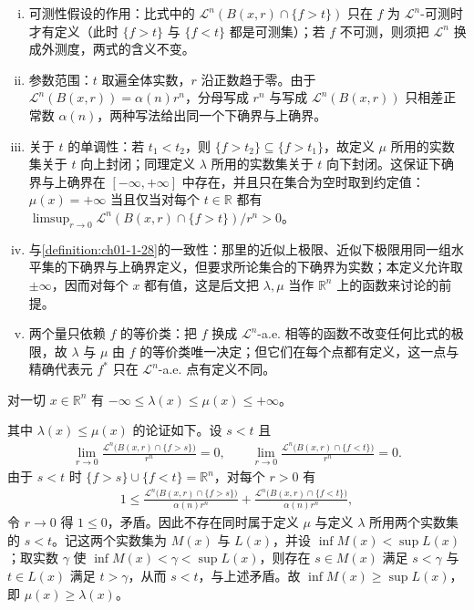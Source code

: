 \documentclass[../../main.tex]{subfiles}%
\begin{document}
\begin{remark}\label{remark:ch05-def-5-8-条件}
\begin{enumerate}[(i)]
\item 可测性假设的作用：比式中的 $\mathcal{L}^n(B(x,r)\cap\{f>t\})$ 只在 $f$ 为 $\mathcal{L}^n$-可测时才有定义（此时 $\{f>t\}$ 与 $\{f<t\}$ 都是可测集）；若 $f$ 不可测，则须把 $\mathcal{L}^n$ 换成外测度，两式的含义不变。
\item 参数范围：$t$ 取遍全体实数，$r$ 沿正数趋于零。由于 $\mathcal{L}^n(B(x,r))=\alpha(n)r^n$，分母写成 $r^n$ 与写成 $\mathcal{L}^n(B(x,r))$ 只相差正常数 $\alpha(n)$，两种写法给出同一个下确界与上确界。
\item 关于 $t$ 的单调性：若 $t_1<t_2$，则 $\{f>t_2\}\subseteq\{f>t_1\}$，故定义 $\mu$ 所用的实数集关于 $t$ 向上封闭；同理定义 $\lambda$ 所用的实数集关于 $t$ 向下封闭。这保证下确界与上确界在 $[-\infty,+\infty]$ 中存在，并且只在集合为空时取到约定值：$\mu(x)=+\infty$ 当且仅当对每个 $t\in\mathbb{R}$ 都有 $\limsup_{r\to0}\mathcal{L}^n(B(x,r)\cap\{f>t\})/r^n>0$。
\item 与\cref{definition:ch01-1-28}的一致性：那里的近似上极限、近似下极限用同一组水平集的下确界与上确界定义，但要求所论集合的下确界为实数；本定义允许取 $\pm\infty$，因而对每个 $x$ 都有值，这是后文把 $\lambda,\mu$ 当作 $\mathbb{R}^n$ 上的函数来讨论的前提。 %
\item 两个量只依赖 $f$ 的等价类：把 $f$ 换成 $\mathcal{L}^n$-a.e. 相等的函数不改变任何比式的极限，故 $\lambda$ 与 $\mu$ 由 $f$ 的等价类唯一决定；但它们在每个点都有定义，这一点与精确代表元 $f^{*}$ 只在 $\mathcal{L}^n$-a.e. 点有定义不同。
\end{enumerate}
\end{remark}

\begin{remark}\label{remark:ch05-def-5-8-序}
对一切 $x\in\mathbb{R}^n$ 有 $-\infty\leqslant\lambda(x)\leqslant\mu(x)\leqslant+\infty$。

其中 $\lambda(x)\leqslant\mu(x)$ 的论证如下。设 $s<t$ 且
\begin{align*}
\lim_{r\to0}\frac{\mathcal{L}^n\bigl(B(x,r)\cap\{f>s\}\bigr)}{r^n}=0,\qquad
\lim_{r\to0}\frac{\mathcal{L}^n\bigl(B(x,r)\cap\{f<t\}\bigr)}{r^n}=0 .
\end{align*}
由于 $s<t$ 时 $\{f>s\}\cup\{f<t\}=\mathbb{R}^n$，对每个 $r>0$ 有
\begin{align*}
1\leqslant\frac{\mathcal{L}^n\bigl(B(x,r)\cap\{f>s\}\bigr)}{\alpha(n)r^n}+\frac{\mathcal{L}^n\bigl(B(x,r)\cap\{f<t\}\bigr)}{\alpha(n)r^n},
\end{align*}
令 $r\to0$ 得 $1\leqslant0$，矛盾。因此不存在同时属于定义 $\mu$ 与定义 $\lambda$ 所用两个实数集的 $s<t$。记这两个实数集为 $M(x)$ 与 $L(x)$，并设 $\inf M(x)<\sup L(x)$；取实数 $\gamma$ 使 $\inf M(x)<\gamma<\sup L(x)$，则存在 $s\in M(x)$ 满足 $s<\gamma$ 与 $t\in L(x)$ 满足 $t>\gamma$，从而 $s<t$，与上述矛盾。故 $\inf M(x)\geqslant\sup L(x)$，即 $\mu(x)\geqslant\lambda(x)$。
\end{remark}
\end{document}
